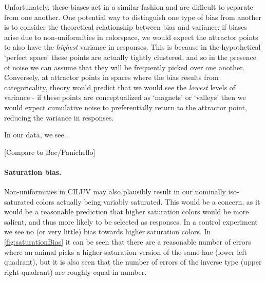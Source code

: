 Unfortunately, these biases act in a similar fashion and are difficult to separate from one another. One potential way to distinguish one type of bias from another is to consider the theoretical relationship between bias and variance: if biases arise due to non-uniformities in colorspace, we would expect the attractor points to also have the \emph{highest} variance in responses. This is because in the hypothetical `perfect space' these points are actually tightly clustered, and so in the presence of noise we can assume that they will be frequently picked over one another. Conversely, at attractor points in spaces where the bias results from categoricality, theory would predict that we would see the \emph{lowest} levels of variance - if these points are conceptualized as `magnets' or `valleys' then we would expect cumulative noise to preferentially return to the attractor point, reducing the variance in responses.

In our data, we see...

[Compare to Bae/Panichello]

\paragraph{Saturation bias.}

Non-uniformities in CILUV may also plausibly result in our nominally iso-saturated colors actually being variably saturated. This would be a concern, as it would be a reasonable prediction that higher saturation colors would be more salient, and thus more likely to be selected as responses. In a control experiment we see no (or very little) bias towards higher saturation colors. In \autoref{fig:saturationBias} it can be seen that there are a reasonable number of errors where an animal picks a higher saturation version of the same hue (lower left quadrant), but it is also seen that the number of errors of the inverse type (upper right quadrant) are roughly equal in number.

